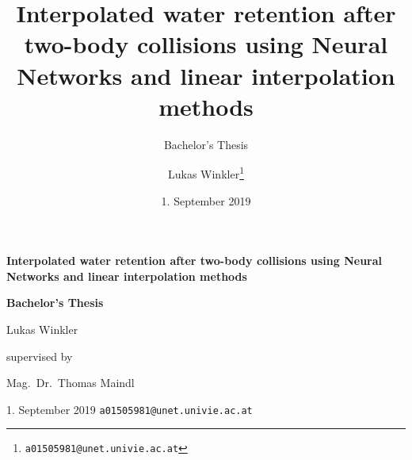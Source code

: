 
\title{Interpolated water retention after two-body collisions using Neural Networks and linear interpolation methods}
\subtitle{Bachelor's Thesis}
\author{Lukas Winkler\footnote{\texttt{a01505981@unet.univie.ac.at}}}
\date{1. September 2019}



	
\begin{titlepage}
	\vspace*{4cm}
	\centering

	{\huge\sffamily\bfseries Interpolated water retention after two-body collisions using Neural Networks and linear interpolation methods\par}
	{\sffamily\bfseries Bachelor's Thesis\par}
	\vspace{2cm}
	{\Large Lukas Winkler\par}
	\vfill
	\textsf{supervised by}\par
	{\large Mag.~Dr.~Thomas Maindl\par}
	\vfill
	{\large 1. September 2019 \hfill\texttt{a01505981@unet.univie.ac.at}\par}
\end{titlepage}

\tableofcontents











\appendix




\printbibliography




